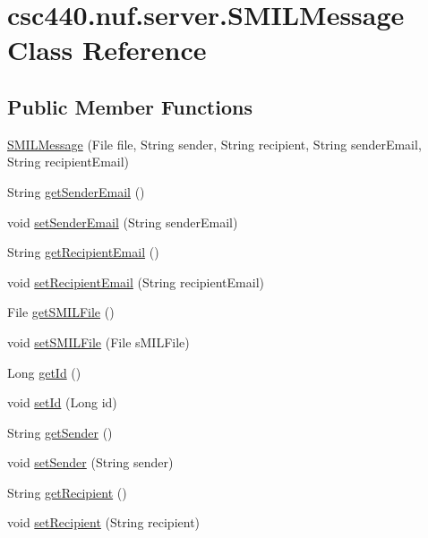 \hypertarget{classcsc440_1_1nuf_1_1server_1_1_s_m_i_l_message}{\section{csc440.\-nuf.\-server.\-S\-M\-I\-L\-Message Class Reference}
\label{classcsc440_1_1nuf_1_1server_1_1_s_m_i_l_message}
}
\subsection*{Public Member Functions}
\begin{DoxyCompactItemize}
\item 
\hyperlink{classcsc440_1_1nuf_1_1server_1_1_s_m_i_l_message_af1d70e5d15f2bfe64144c4c6c11b6d2f}{S\-M\-I\-L\-Message} (File file, String sender, String recipient, String sender\-Email, String recipient\-Email)
\item 
String \hyperlink{classcsc440_1_1nuf_1_1server_1_1_s_m_i_l_message_acc420f2ba04adbacaf4f601a52aaedda}{get\-Sender\-Email} ()
\item 
void \hyperlink{classcsc440_1_1nuf_1_1server_1_1_s_m_i_l_message_a839f38b917f400f15cc39046b99d7ec6}{set\-Sender\-Email} (String sender\-Email)
\item 
String \hyperlink{classcsc440_1_1nuf_1_1server_1_1_s_m_i_l_message_ac2f789260ce6f5adad7e3db119c5e7c0}{get\-Recipient\-Email} ()
\item 
void \hyperlink{classcsc440_1_1nuf_1_1server_1_1_s_m_i_l_message_a04d79c49862dd1cde96912887d427b6d}{set\-Recipient\-Email} (String recipient\-Email)
\item 
File \hyperlink{classcsc440_1_1nuf_1_1server_1_1_s_m_i_l_message_a6288c6662d5ca2c83e64655a5035c86f}{get\-S\-M\-I\-L\-File} ()
\item 
void \hyperlink{classcsc440_1_1nuf_1_1server_1_1_s_m_i_l_message_af7f723cd1bac6a7298a2d1f6f9cd9600}{set\-S\-M\-I\-L\-File} (File s\-M\-I\-L\-File)
\item 
Long \hyperlink{classcsc440_1_1nuf_1_1server_1_1_s_m_i_l_message_a3244ff730fcc1e2935e268358d0c507d}{get\-Id} ()
\item 
void \hyperlink{classcsc440_1_1nuf_1_1server_1_1_s_m_i_l_message_ae0bf6116cba42238cf2ddd705222021c}{set\-Id} (Long id)
\item 
String \hyperlink{classcsc440_1_1nuf_1_1server_1_1_s_m_i_l_message_a9a0d3c988da6a99e6b5835f97c93842b}{get\-Sender} ()
\item 
void \hyperlink{classcsc440_1_1nuf_1_1server_1_1_s_m_i_l_message_a918480c6eea346cccc1b9ac3f2f46713}{set\-Sender} (String sender)
\item 
String \hyperlink{classcsc440_1_1nuf_1_1server_1_1_s_m_i_l_message_ab5695cbd1178caab9f7cce13bedf8688}{get\-Recipient} ()
\item 
void \hyperlink{classcsc440_1_1nuf_1_1server_1_1_s_m_i_l_message_ab41e6a3de45845f04ec95588eefb6c23}{set\-Recipient} (String recipient)
\end{DoxyCompactItemize}


